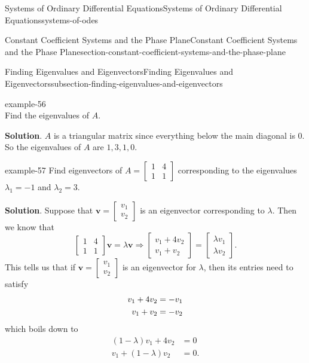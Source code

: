 \documentclass[oneside,10pt,]{book}
\numberwithin{equation}{section}
\renewcommand{\vec}[1]{\mathbf{#1}}
\newcommand{\amp}{&}
\begin{document}
\begin{chapterptx}{Systems of Ordinary Differential Equations}{}{Systems of Ordinary Differential Equations}{}{}{systems-of-odes}
\begin{sectionptx}{Constant Coefficient Systems and the Phase Plane}{}{Constant Coefficient Systems and the Phase Plane}{}{}{section-constant-coefficient-systems-and-the-phase-plane}
\begin{subsectionptx}{Finding Eigenvalues and Eigenvectors}{}{Finding Eigenvalues and Eigenvectors}{}{}{subsection-finding-eigenvalues-and-eigenvectors}
\begin{example}{}{example-56}
\begin{equation*}
\end{equation*}
Find the eigenvalues of \(A\).%
\par\smallskip%
\noindent\textbf{Solution}.\hypertarget{solution-53}{}\quad%
\hypertarget{p-338}{}%
\(A\) is a triangular matrix since everything below the main diagonal is \(0\). So the eigenvalues of \(A\) are \(1,3,1,0\).%
\end{example}
\begin{example}{}{example-57}%
\hypertarget{p-339}{}%
Find eigenvectors of \(A = \begin{bmatrix}1 \amp  4 \\ 1 \amp  1\end{bmatrix}\) corresponding to the eigenvalues \(\lambda_{1} = -1\) and \(\lambda_{2} = 3\).%
\par\smallskip%
\noindent\textbf{Solution}.\hypertarget{solution-54}{}\quad%
\hypertarget{p-340}{}%
Suppose that \(\vec{v} = \begin{bmatrix} v_{1} \\ v_{2} \end{bmatrix}\) is an eigenvector corresponding to \(\lambda\). Then we know that%
\begin{equation*}
\begin{bmatrix}1 \amp  4 \\ 1 \amp  1\end{bmatrix}\vec{v} = \lambda\vec{v} \Rightarrow \begin{bmatrix}v_{1}+4v_{2} \\ v_{1} + v_{2}\end{bmatrix} = \begin{bmatrix} \lambda v_{1} \\ \lambda v_{2} \end{bmatrix}.
\end{equation*}
This tells us that if \(\vec{v} = \begin{bmatrix}v_{1} \\ v_{2} \end{bmatrix}\) is an eigenvector for \(\lambda\), then its entries need to satisfy%
\begin{align}
v_{1}+4v_{2}\amp =-v_{1}\notag\\
v_{1}+v_{2} \amp = -v_{2}\notag
\end{align}
which boils down to%
\begin{align*}
(1-\lambda)v_{1}+4v_{2} \amp = 0\\
v_{1} + (1-\lambda)v_{2} \amp = 0.
\end{align*}
%
\par

\end{example}
\end{subsectionptx}
\end{sectionptx}
\end{chapterptx}
\end{document}
